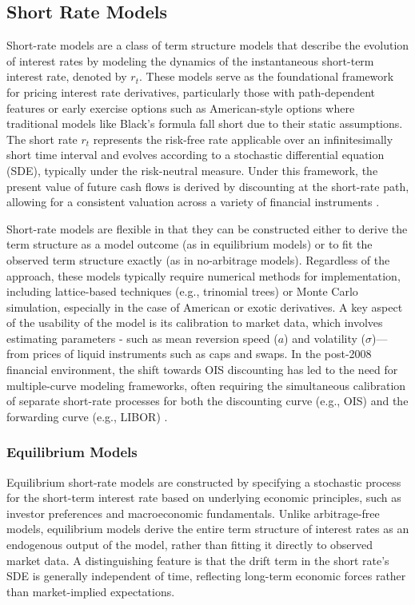 \subsection{Short Rate Models} \label{short_rate_models}
Short-rate models are a class of term structure models that describe the evolution of interest rates by modeling the dynamics of the instantaneous short-term interest rate, denoted by $r_{t}$. These models serve as the foundational framework for pricing interest rate derivatives, particularly those with path-dependent features or early exercise options such as American-style options where traditional models like Black's formula fall short due to their static assumptions. The short rate $r_{t}$ represents the risk-free rate applicable over an infinitesimally short time interval and evolves according to a stochastic differential equation (SDE), typically under the risk-neutral measure. Under this framework, the present value of future cash flows is derived by discounting at the short-rate path, allowing for a consistent valuation across a variety of financial instruments \parencite[pp.~706--735]{hull2015optionsfutures}.

Short-rate models are flexible in that they can be constructed either to derive the term structure as a model outcome (as in equilibrium models) or to fit the observed term structure exactly (as in no-arbitrage models). Regardless of the approach, these models typically require numerical methods for implementation, including lattice-based techniques (e.g., trinomial trees) or Monte Carlo simulation, especially in the case of American or exotic derivatives. A key aspect of the usability of the model is its calibration to market data, which involves estimating parameters - such as mean reversion speed ($a$) and volatility ($\sigma$)—from prices of liquid instruments such as caps and swaps. In the post-2008 financial environment, the shift towards OIS discounting has led to the need for multiple-curve modeling frameworks, often requiring the simultaneous calibration of separate short-rate processes for both the discounting curve (e.g., OIS) and the forwarding curve (e.g., LIBOR) \parencite[pp.~706--735]{hull2015optionsfutures}.

\subsubsection{Equilibrium Models} \label{equilibrium_models}
Equilibrium short-rate models are constructed by specifying a stochastic process for the short-term interest rate based on underlying economic principles, such as investor preferences and macroeconomic fundamentals. Unlike arbitrage-free models, equilibrium models derive the entire term structure of interest rates as an endogenous output of the model, rather than fitting it directly to observed market data. A distinguishing feature is that the drift term in the short rate's SDE is generally independent of time, reflecting long-term economic forces rather than market-implied expectations.

